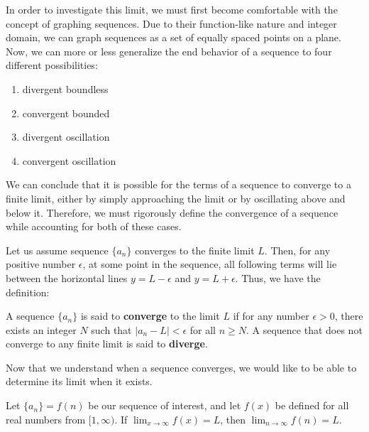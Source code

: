 \documentclass[11pt]{article}
\begin{document}
In order to investigate this limit, we must first become comfortable with the concept of graphing sequences. Due to their function-like nature and integer domain, we can graph sequences as a set of equally spaced points on a plane. Now, we can more or less generalize the end behavior of a sequence to four different possibilities: \\

\begin{center}
    \begin{enumerate}
    \item divergent boundless
    \item convergent bounded
    \item divergent oscillation
    \item convergent oscillation
\end{enumerate}
\end{center}
\vspace{0.5 cm}


We can conclude that it is possible for the terms of a sequence to converge to a finite limit, either by simply approaching the limit or by oscillating above and below it. Therefore, we must rigorously define the convergence of a sequence while accounting for both of these cases. 

Let us assume sequence $\{a_n\}$ converges to the finite limit $L$. Then, for any positive number $\epsilon$, at some point in the sequence, all following terms will lie between the horizontal lines $y=L-\epsilon$ and $y=L+\epsilon$. Thus, we have the definition:\\

\begin{center}
A sequence $\{a_n\}$ is said to \textbf{converge} to the limit $L$ if for any number $\epsilon>0$, there exists an integer $N$ such that $|a_n-L|<\epsilon$ for all $n\geq N$. A sequence that does not converge to any finite limit is said to \textbf{diverge}.
\end{center}
\vspace{0.5 cm}

Now that we understand when a sequence converges, we would like to be able to determine its limit when it exists. \\

\begin{center}
Let $\{a_n\}=f(n)$ be our sequence of interest, and let $f(x)$ be defined for all real numbers from $[1, \infty)$. If $\lim_{x\to \infty}f(x)=L$, then $\lim_{n\to \infty}f(n)=L$. 
\end{center}
\vspace{0.5 cm}
\end{document}
